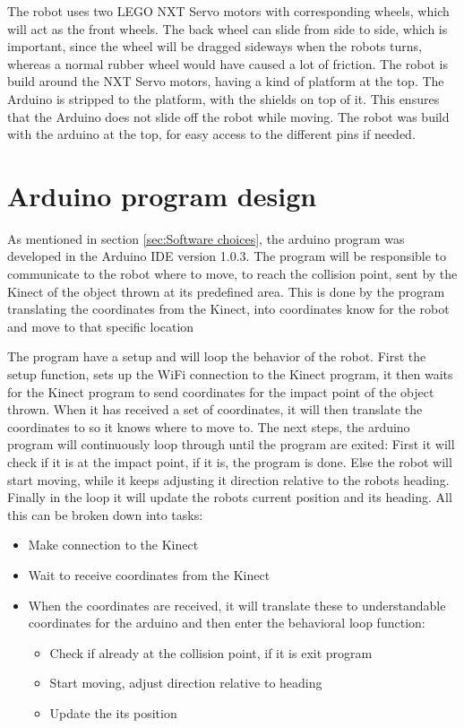 The robot uses two LEGO NXT Servo motors with corresponding wheels, which will act as the front wheels. The back wheel can slide from side to side, which is important, since the wheel will be dragged sideways when the robots turns, whereas a normal rubber wheel would have caused a lot of friction. 
The robot is build around the NXT Servo motors, having a kind of platform at the top. The Arduino is stripped to the platform, with the shields on top of it. This ensures that the Arduino does not slide off the robot while moving.
The robot was build with the arduino at the top, for easy access to the different pins if needed. 

\section{Arduino program design}
\label{sec:Arduino program design}
As mentioned in section \ref{sec:Software choices}, the arduino program was developed in the Arduino IDE version 1.0.3. The program will be responsible to communicate to the robot where to move, to reach the collision point, sent by the Kinect of the object thrown at its predefined area. This is done by the program translating the coordinates from the Kinect, into coordinates know for the robot and move to that specific location

The program have a setup and will loop the behavior of the robot. First the setup function, sets up the WiFi connection to the Kinect program, it then waits for the Kinect program to send coordinates for the impact point of the object thrown. When it has received a set of coordinates, it will then translate the coordinates to so it knows where to move to. The next steps, the arduino program will continuously loop through until the program are exited: First it will check if it is at the impact point, if it is, the program is done. Else the robot will start moving, while it keeps adjusting it direction relative to the robots heading. Finally in the loop it will update the robots current position and its heading. All this can be broken down into tasks:

\begin{itemize}
	\item Make connection to the Kinect
	\item Wait to receive coordinates from the Kinect
	\item When the coordinates are received, it will translate these to understandable coordinates for the arduino and then enter the behavioral loop function:
	\begin{itemize}
		\item Check if already at the collision point, if it is exit program
		\item Start moving, adjust direction relative to heading
		\item Update the its position
	\end{itemize}
\end{itemize}
 

